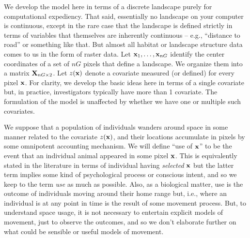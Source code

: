 We develop the model here in terms of a discrete landscape purely for
computational expediency. That said, essentially no landscape on your
computer is continuous, except in the rare case that the landscape is
defined strictly in terms of variables that themselves are inherently
continuous -- e.g., ``distance to road'' or something like that.  But
almost all habitat or landscape structure data comes to us in the form
of raster data.  Let ${\bf x}_{1},\ldots,{\bf x}_{nG}$ identify the center
coordinates of a set of $nG$ pixels that define a landscape.
We organize them into a matrix
${\bf X}_{nG \times 2}$.  Let $z({\bf x})$ denote a covariate measured
(or defined) for
every pixel ${\bf x}$. For clarity, we develop the basic ideas here in terms of a
single covariate but, in practice, investigators typically have more
than 1 covariate. The formulation of the model is unaffected by
whether we have one or multiple such covariates. 

We suppose that a population of individuals wanders around space in
some manner related to the covariate $z({\bf x})$, and their locations
accumulate in pixels by some omnipotent accounting mechanism. We will
define ``use of ${\bf x}$'' to be the event that an individual animal
appeared in some pixel ${\bf x}$. This is equivalently stated in the
literature in terms of individual having {\it selected} ${\bf x}$ but
the latter term implies some kind of psychological process or
conscious intent, and so we keep to the term {\it use} as much as
possible.  Also, as a biological matter, use is the outcome of
individuals moving around their home range but, i.e., where an
individual is at any point in time is the result of some movement
process. But, to understand space usage, it is not necessary to
entertain explicit models of movement, just to observe the outcomes,
and so we don't elaborate further on what could be sensible or useful
models of movement.

